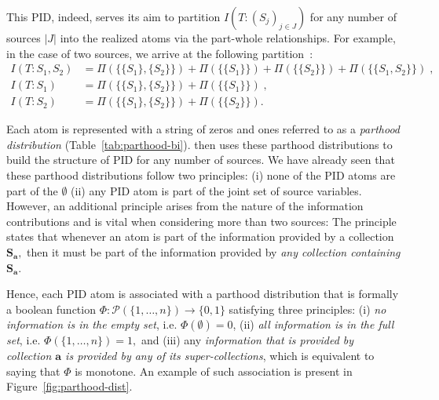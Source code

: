 \documentclass[10pt]{article}
\theoremstyle{definition}
\theoremstyle{plain}
\begin{document}
This PID, indeed, serves its aim to partition $I(T: (S_j)_{j\in J})$ for any number of sources $|J|$ into the realized atoms via the part-whole relationships. For example, in the case of two sources, we arrive at the following partition~\citep{gutknecht_bits_2021, williams_nonnegative_2010}:
\begin{equation*}
    \begin{split}
        I(T: S_1, S_2) &= \Pi(\{\{S_1\},\{S_2\}\}) + \Pi(\{\{S_1\}\}) + \Pi(\{\{S_2\}\}) + \Pi(\{\{S_1,S_2\}\})\; ,\\
        I(T: S_1) &= \Pi(\{\{S_1\},\{S_2\}\}) + \Pi(\{\{S_1\}\})\; ,\\
        I(T: S_2) &= \Pi(\{\{S_1\},\{S_2\}\}) + \Pi(\{\{S_2\}\}).
    \end{split}
\end{equation*}

Each atom is represented with a string of zeros and ones referred to as a \emph{parthood distribution} (Table~\ref{tab:parthood-bi}). \cite{gutknecht_bits_2021} then uses these parthood distributions to build the structure of PID for any number of sources. We have already seen that these parthood distributions follow two principles: (i) none of the PID atoms are part of the $\emptyset$ (ii) any PID atom is part of the joint set of source variables. However, an additional principle arises from the nature of the information contributions and is vital when considering more than two sources: The principle states that whenever an atom is part of the information provided by a collection $\bm S_\mathbf{a},$ then it must be part of the information provided by \emph{any collection containing $\bm S_\mathbf{a}$}. 

Hence, each PID atom is associated with a parthood distribution that is formally a boolean function $\Phi: \mathcal{P}(\{1, \dots, n\}) \to \{0, 1\}$ satisfying three principles: (i) \emph{no information is in the empty set}, i.e. $\Phi(\emptyset) = 0$, (ii) \emph{all information is in the full set}, i.e. $\Phi(\{1, \ldots, n\})=1,$ and (iii) any \emph{information that is provided by collection $\bm a$ is provided by any of its super-collections}, which is equivalent to saying that $\Phi$ is monotone. An example of such association is present in Figure~\ref{fig:parthood-dist}.
\end{document}
